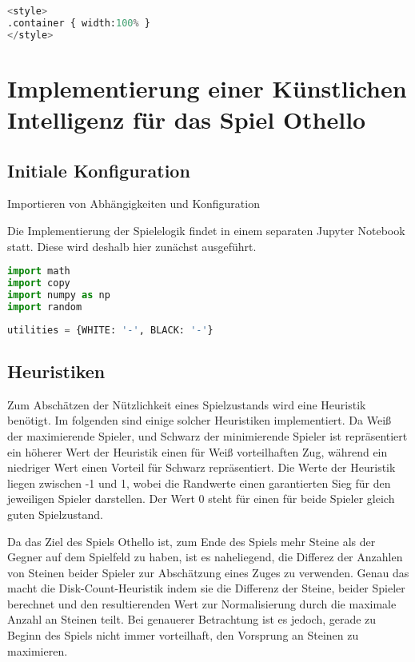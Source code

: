 \begin{lstlisting}[language=Python]
%%HTML
<style>
.container { width:100% }
</style>
\end{lstlisting}

\hypertarget{implementierung-einer-kuxfcnstlichen-intelligenz-fuxfcr-das-spiel-othello}{%
\section{Implementierung einer Künstlichen Intelligenz für das Spiel
Othello}\label{implementierung-einer-kuxfcnstlichen-intelligenz-fuxfcr-das-spiel-othello}}

\hypertarget{initiale-konfiguration}{%
\subsection{Initiale Konfiguration}\label{initiale-konfiguration}}

Importieren von Abhängigkeiten und Konfiguration

Die Implementierung der Spielelogik findet in einem separaten Jupyter
Notebook statt. Diese wird deshalb hier zunächst ausgeführt.

\begin{lstlisting}[language=Python]
import math
import copy
import numpy as np
import random
\end{lstlisting}

\begin{lstlisting}[language=Python]
utilities = {WHITE: '-', BLACK: '-'}
\end{lstlisting}

\hypertarget{heuristiken}{%
\subsection{Heuristiken}\label{heuristiken}}

Zum Abschätzen der Nützlichkeit eines Spielzustands wird eine Heuristik
benötigt. Im folgenden sind einige solcher Heuristiken implementiert. Da
Weiß der maximierende Spieler, und Schwarz der minimierende Spieler ist
repräsentiert ein höherer Wert der Heuristik einen für Weiß
vorteilhaften Zug, während ein niedriger Wert einen Vorteil für Schwarz
repräsentiert. Die Werte der Heuristik liegen zwischen -1 und 1, wobei
die Randwerte einen garantierten Sieg für den jeweiligen Spieler
darstellen. Der Wert 0 steht für einen für beide Spieler gleich guten
Spielzustand.

Da das Ziel des Spiels Othello ist, zum Ende des Spiels mehr Steine als
der Gegner auf dem Spielfeld zu haben, ist es naheliegend, die Differez
der Anzahlen von Steinen beider Spieler zur Abschätzung eines Zuges zu
verwenden. Genau das macht die Disk-Count-Heuristik indem sie die
Differenz der Steine, beider Spieler berechnet und den resultierenden
Wert zur Normalisierung durch die maximale Anzahl an Steinen teilt. Bei
genauerer Betrachtung ist es jedoch, gerade zu Beginn des Spiels nicht
immer vorteilhaft, den Vorsprung an Steinen zu maximieren.

